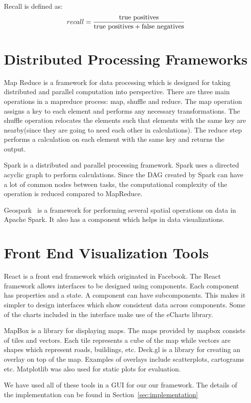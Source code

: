 Recall is defined as:
$$recall = \frac{\textnormal{true positives}}{\textnormal{true positives} + \textnormal{false negatives}}$$

\section{Distributed Processing Frameworks}
Map Reduce\citep{dean2008mapreduce} is a framework for data processing which is designed for taking distributed and parallel computation into perspective. There are three main operations in a mapreduce process: map, shuffle and reduce. The map operation assigns a key to each element and performs any necessary transformations. The shuffle operation relocates the elements such that elements with the same key are nearby(since they are going to need each other in calculations). The reduce step performs a calculation on each element with the same key and returns the output.

Spark\citep{shanahan2015large,zaharia2016apache} is a distributed and parallel processing framework. Spark uses a directed acyclic graph to perform calculations. Since the DAG created by Spark can have a lot of common nodes between tasks, the computational complexity of the operation is reduced compared to MapReduce.

Geospark~\citep{yu2015geospark} is a framework for performing several spatial operations on data in Apache Spark. It also has a component which helps in data visualizations\citep{yu2018src}.

\section{Front End Visualization Tools}
React\citep{reactjs} is a front end framework which originated in Facebook. The React framework allows interfaces to be designed using components. Each component has properties and a state. A component can have subcomponents. This makes it simpler to design interfaces which show consistent data across components. Some of the charts included in the interface make use of the eCharts library\citep{echarts}.

MapBox\citep{mapbox} is a library for displaying maps. The maps provided by mapbox consists of tiles and vectors. Each tile represents a cube of the map while vectors are shapes which represent roads, buildings, etc. Deck.gl\citep{deckgl} is a library for creating an overlay on top of the map. Examples of overlays include scatterplots, cartograms etc. Matplotlib was also used for static plots for evaluation\citep{hunter2007matplotlib}.

We have used all of these tools in a GUI for our our framework. The details of the implementation can be found in Section~\ref{sec:implementation}

